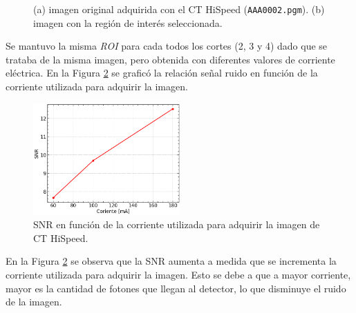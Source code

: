 \documentclass[11pt, twocolumn]{article}
\begin{document}
\begin{figure}[htbp]
  \centering
  \hfill
  \hfill
  \caption{(a) imagen original adquirida con el CT HiSpeed (\texttt{AAA0002.pgm}). (b) imagen con la región de interés seleccionada.}
  \label{fig:figuras_ej_7}
\end{figure}

Se mantuvo la misma \textit{ROI} para cada todos los cortes (2, 3 y 4) dado que se trataba de la misma imagen, pero obtenida con diferentes valores de corriente eléctrica. En la Figura \ref{fig:SNR_vs_I} se graficó la relación señal ruido en función de la corriente utilizada para adquirir la imagen.

\begin{figure} [htbp]
  \centering
  \includegraphics[width=0.5\textwidth]{images/ej_7/SNR_corriente.png}
  \caption{SNR en función de la corriente utilizada para adquirir la imagen de CT HiSpeed.}
  \label{fig:SNR_vs_I}
\end{figure}

En la Figura \ref{fig:SNR_vs_I} se observa que la SNR aumenta a medida que se incrementa la corriente utilizada para adquirir la imagen. Esto se debe a que a mayor corriente, mayor es la cantidad de fotones que llegan al detector, lo que disminuye el ruido de la imagen.
\end{document}
